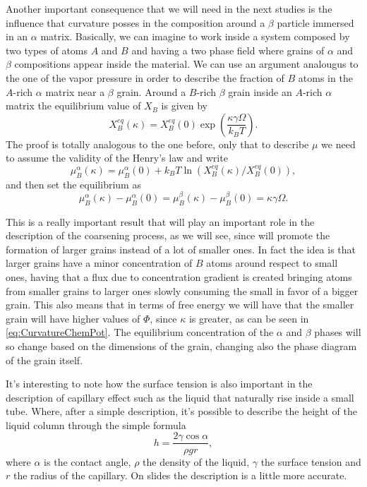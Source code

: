 Another important consequence that we will need in the next studies is the influence that curvature posses in the composition around a $\beta$ particle immersed in an $\alpha$ matrix. Basically, we can imagine to work inside a system composed by two types of atoms $A$ and $B$ and having a two phase field where grains of $\alpha$ and $\beta$ compositions appear inside the material. We can use an argument analougus to the one of the vapor pressure in order to describe the fraction of $B$ atoms in the $A$-rich $\alpha$ matrix near a $\beta$ grain.
{
    Around a $B$-rich $\beta$ grain inside an $A$-rich $\alpha$ matrix the equilibrium value of $X_B$ is given by
    \begin{equation}
        \label{eq:EquMolarFracCurva}
        X_B^{eq}(\kappa) = X_B^{eq}(0)\exp\left( \frac{\kappa\gamma\Omega}{k_BT} \right).
    \end{equation}
}
{
    The proof is totally analogous to the one before, only that to describe $\mu$ we need to assume the validity of the Henry's law and write
    \begin{equation}
        \mu_B^\alpha(\kappa) = \mu_B^\alpha(0) + k_BT\ln\left( X_B^{eq}(\kappa)/X_B^{eq}(0) \right),
    \end{equation}
    and then set the equilibrium as
    \begin{equation}
        \mu_B^\alpha(\kappa) - \mu_B^\alpha(0) = \mu_B^\beta(\kappa) - \mu_B^\beta(0) = \kappa\gamma\Omega.
    \end{equation}
}

\noindent
This is a really important result that will play an important role in the description of the coarsening process, as we will see, since will promote the formation of larger grains instead of a lot of smaller ones. In fact the idea is that larger grains have a minor concentration of $B$ atoms around respect to small ones, having that a flux due to concentration gradient is created bringing atoms from smaller grains to larger ones slowly consuming the small in favor of a bigger grain. This also means that in terms of free energy we will have that the smaller grain will have higher values of $\Phi$, since $\kappa$ is greater, as can be seen in \eqref{eq:CurvatureChemPot}. The equilibrium concentration of the $\alpha$ and $\beta$ phases will so change based on the dimensions of the grain, changing also the phase diagram of the grain itself.

\nt
{
    It's interesting to note how the surface tension is also important in the description of capillary effect such as the liquid that naturally rise inside a small tube. Where, after a simple description, it's possible to describe the height of the liquid column through the simple formula
    \begin{displaymath}
        h = \frac{2\gamma\cos\alpha}{\rho g r},
    \end{displaymath}
    where $\alpha$ is the contact angle, $\rho$ the density of the liquid, $\gamma$ the surface tension and $r$ the radius of the capillary. On slides the description is a little more accurate.
}

